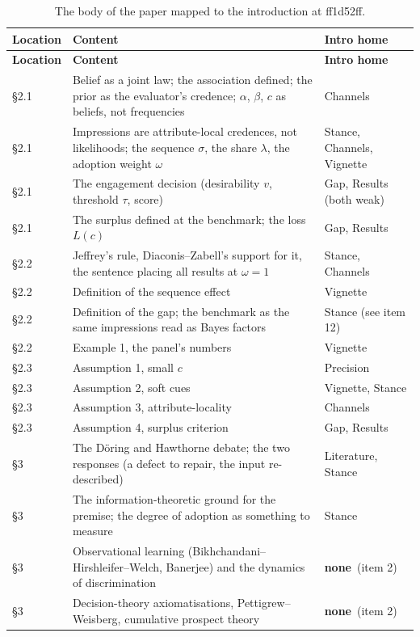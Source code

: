 \documentclass[11pt,a4paper]{article}
\newcommand{\none}{\textbf{none}}
\begin{document}
\begin{longtable}{@{}p{1.7cm}p{9.6cm}p{4.0cm}@{}}
\caption{The body of the paper mapped to the introduction at ff1d52ff.}\label{tab:map}\\
\toprule
\textbf{Location} & \textbf{Content} & \textbf{Intro home}\\
\midrule
\endfirsthead
\toprule
\textbf{Location} & \textbf{Content} & \textbf{Intro home}\\
\midrule
\endhead
\bottomrule
\endfoot
\S2.1 & Belief as a joint law; the association defined; the prior as the evaluator's credence; $\alpha$, $\beta$, $c$ as beliefs, not frequencies & Channels\\
\S2.1 & Impressions are attribute-local credences, not likelihoods; the sequence $\sigma$, the share $\lambda$, the adoption weight $\omega$ & Stance, Channels, Vignette\\
\S2.1 & The engagement decision (desirability $v$, threshold $\tau$, score) & Gap, Results (both weak)\\
\S2.1 & The surplus defined at the benchmark; the loss $L(c)$ & Gap, Results\\
\addlinespace
\S2.2 & Jeffrey's rule, Diaconis--Zabell's support for it, the sentence placing all results at $\omega=1$ & Stance, Channels\\
\S2.2 & Definition of the sequence effect & Vignette\\
\S2.2 & Definition of the gap; the benchmark as the same impressions read as Bayes factors & Stance (see item 12)\\
\S2.2 & Example 1, the panel's numbers & Vignette\\
\addlinespace
\S2.3 & Assumption 1, small $c$ & Precision\\
\S2.3 & Assumption 2, soft cues & Vignette, Stance\\
\S2.3 & Assumption 3, attribute-locality & Channels\\
\S2.3 & Assumption 4, surplus criterion & Gap, Results\\
\addlinespace
\S3 & The Döring and Hawthorne debate; the two responses (a defect to repair, the input re-described) & Literature, Stance\\
\S3 & The information-theoretic ground for the premise; the degree of adoption as something to measure & Stance\\
\S3 & Observational learning (Bikhchandani--Hirshleifer--Welch, Banerjee) and the dynamics of discrimination & \none\ (item 2)\\
\S3 & Decision-theory axiomatisations, Pettigrew--Weisberg, cumulative prospect theory & \none\ (item 2)\\

\end{longtable}
\end{document}
